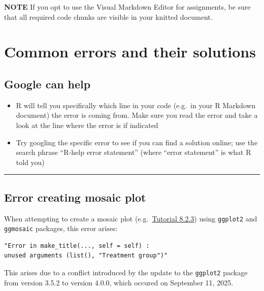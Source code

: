 \documentclass[
]{book}
\providecommand{\tightlist}{%
  \setlength{\itemsep}{0pt}\setlength{\parskip}{0pt}}
\begin{document}
\textbf{NOTE}
If you opt to use the Visual Markdown Editor for assignments, be sure that all required code chunks are visible in your knitted document.

\chapter*{Common errors and their solutions}\label{common-errors-and-their-solutions}

\section*{Google can help}\label{google-can-help}

\begin{itemize}
\tightlist
\item
  R will tell you specifically which line in your code (e.g.~in your R Markdown document) the error is coming from. Make sure you read the error and take a look at the line where the error is if indicated
\item
  Try googling the specific error to see if you can find a solution online; use the search phrase ``R-help error statement'' (where ``error statement'' is what R told you)
\end{itemize}

\begin{center}\rule{0.5\linewidth}{0.5pt}\end{center}

\section*{Error creating mosaic plot}\label{error-creating-mosaic-plot}

When attempting to create a mosaic plot (e.g.~\href{https://ubco-biology.github.io/BIOL202/vis2_2cat.html\#mosaic_plot}{Tutorial 8.2.3}) using \texttt{ggplot2} and \texttt{ggmosaic} packages, this error arises:

\begin{verbatim}
"Error in make_title(..., self = self) :
unused arguments (list(), "Treatment group")"
\end{verbatim}

This arises due to a conflict introduced by the update to the \texttt{ggplot2} package from version 3.5.2 to version 4.0.0, which occured on September 11, 2025.
\end{document}
